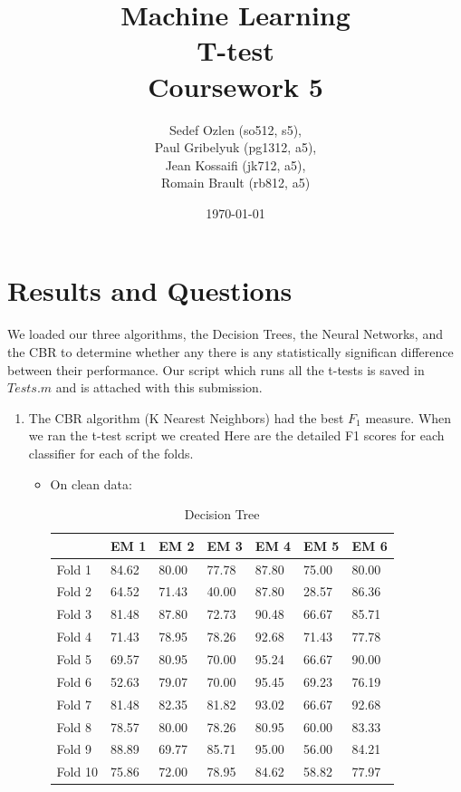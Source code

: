 \documentclass[a4paper,12pt,oneside,final]{report}
\author{
    Sedef Ozlen (so512, s5), \\ 
    Paul Gribelyuk (pg1312, a5), \\
    Jean Kossaifi (jk712, a5), \\ 
    Romain Brault (rb812, a5)
}
\title{\Huge Machine Learning \\ T-test \\ Coursework 5}
\date{\today}
\begin{document}
\maketitle


\chapter{Results and Questions}
We loaded our three algorithms, the Decision Trees, the Neural Networks, and the CBR to determine whether any there is any statistically significan difference between their performance.  Our script which runs all the t-tests is saved in $Tests.m$ and is attached with this submission.
\begin{enumerate}
\item The CBR algorithm (K Nearest Neighbors) had the best $F_1$ measure.  When we ran the t-test script we created
Here are the detailed F1 scores for each classifier for each of the folds.

\begin{itemize}
\item On clean data:
\begin{table} [H]
\begin{center}
\begin{tabular}{l|llllll}
       &  EM 1 & EM 2 & EM 3 & EM 4 & EM 5 & EM 6    \\ \hline
Fold 1 &  84.62 & 80.00 & 77.78 & 87.80 & 75.00 & 80.00    \\ 
Fold 2 &  64.52 & 71.43 & 40.00 & 87.80 & 28.57 & 86.36    \\ 
Fold 3 &  81.48 & 87.80 & 72.73 & 90.48 & 66.67 & 85.71   \\ 
Fold 4 &  71.43 & 78.95 & 78.26 & 92.68 & 71.43 & 77.78   \\ 
Fold 5 &  69.57 & 80.95 & 70.00 & 95.24 & 66.67 & 90.00   \\ 
Fold 6 &  52.63 & 79.07 & 70.00 & 95.45 & 69.23 & 76.19   \\ 
Fold 7 &  81.48 & 82.35 & 81.82 & 93.02 & 66.67 & 92.68   \\ 
Fold 8 &  78.57 & 80.00 & 78.26 & 80.95 & 60.00 & 83.33  \\ 
Fold 9 &  88.89 & 69.77 & 85.71 & 95.00 & 56.00 & 84.21   \\ 
Fold 10 &  75.86 & 72.00 & 78.95 & 84.62 & 58.82 & 77.97   \\ 
\end{tabular}
\caption{ Decision Tree  }
\end{center}
\end{table}


\end{itemize}
\end{enumerate}
\end{document}
